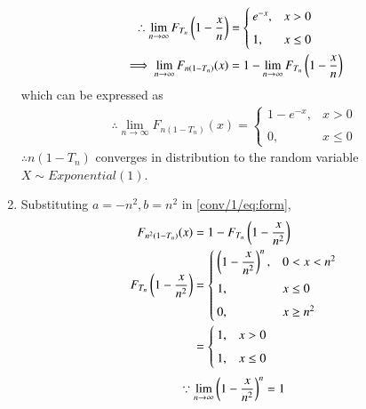 \begin{enumerate}
\begin{align}
\end{align}
\begin{align}
\therefore\displaystyle\lim_{n\to\infty} F_{T_{n}}\left(1-\dfrac{x}{n}\right)&=\begin{cases}
	e^{-x}, & x>0 \\~\\[-1em]
	1, & x\leq 0
	\end{cases} \\
	\implies 
	\displaystyle\lim_{n\to\infty}F_{n(1-T_{n})}(x)&=1-\displaystyle\lim_{n\to\infty} F_{T_{n}}\left(1-\dfrac{x}{n}\right)
\end{align}
which can be expressed as
\begin{align}
\label{conv/1/eq:cdf1}
    \therefore\displaystyle\lim_{n\to\infty} F_{n(1-T_{n})}(x)=\begin{cases}
	1-e^{-x}, & x>0 \\~\\[-1em]
	0, & x\leq 0
	\end{cases} 
\end{align}
$\therefore n(1-T_{n})$ converges in distribution to the random variable $X\sim Exponential(1)$.
\item 
Substituting $a=-n^{2},b=n^{2}$ in \eqref{conv/1/eq:form},
\begin{align}
    F_{n^{2}(1-T_{n})}(x)&=1-F_{T_{n}}\left(1-\dfrac{x}{n^{2}}\right)\\
    F_{T_{n}}\left(1-\dfrac{x}{n^{2}}\right)&=\begin{cases}
	\left(1-\dfrac{x}{n^{2}}\right)^{n}, & 0< x<n^{2} \\~\\[-1em]
	1, & x\leq 0\\~\\[-1em]
	0, & x\geq n^{2}
	\end{cases} \\
	&=\begin{cases}
		1, & x>0 \\~\\[-1em]
		1, & x\leq 0
		\end{cases} 
	\end{align}
	\begin{align}
	\because\displaystyle\lim_{n\to\infty}\left(1-\dfrac{x}{n^{2}}\right)^{n}=1
	\end{align}

\end{enumerate}
